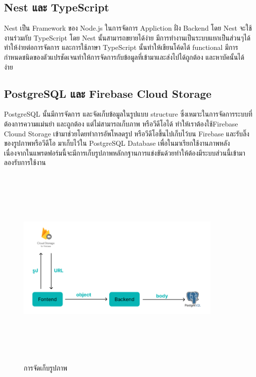 \subsection{Nest และ TypeScript}
Nest เป็น Framework ของ Node.js ในการจัดการ Appliction ฝั่ง Backend โดย Nest จะใช้งานร่วมกับ TypeScript 
โดย Nest นั้นสามารถขยายได้ง่าย มีการทำงานเป็นระบบแยกเป็นส่วนๆได้ ทำให้ง่ายต่อการจัดการ และการใช้ภาษา TypeScript นั้นทำให้เขียนโค้ดได้
functional มีการกำหนดชนิดของตัวแปรชัดเจนทำให้การจัดการกับข้อมูลที่เข้ามาและส่งไปได้ถูกต้อง และหาบัคนั้นได้ง่าย

\subsection{PostgreSQL และ Firebase Cloud Storage}
PostgreSQL นั้นมีการจัดการ และจัดเก็บข้อมูลในรูปแบบ structure ซึ่งเหมาะในการจัดการระบบที่ต้องการความแม่นยำ และถูกต้อง
แต่ไม่สามารถเก็บภาพ หรือวีดีโอได้ ทำให้เราต้องใช้Firebase Clound Storage เข้ามาช่วยโดยทำการอัพโหลดรูป หรือวีดีโอขึ้นไปเก็บไว้บน Firebase และรับลิ๊งของรูปภาพหรือวีดีโอ
มาเก็บไว้ใน PostgreSQL Database เพื่อในมาเรียกใช้งานภาพหลัง เนื่องจากในแพรตฟอร์มนี้จะมีการเก็บรูปภาพหลักกฐานการแข่งขันด้วยทำให้ต้องมีระบบส่วนนี้เข้ามาลองรับการใช้งาน

\begin{figure}[h]
    \begin{center}
    \includegraphics[width=10cm,height=10cm,keepaspectratio]{firebase.png}
    \end{center}
    \caption[การจัดเก็บรูปภาพ]{การจัดเก็บรูปภาพ}
    \label{fig:การจัดเก็บรูปภาพ}
\end{figure}

